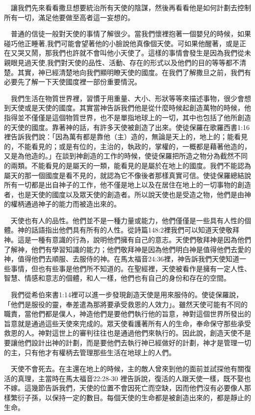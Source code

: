 \documentclass{book}
\begin{document}
　讓我們先來看看撒旦想要統治所有天使的陰謀，然後再看看他是如何計劃去控制所有一切，滿足他要做至高者這一妄想的。

　普通的信徒一般對天使的事情了解很少。當我們懷裡抱著一個嬰兒的時候，如果碰巧他正睡著,我們可能會望著他的小臉說他真像個天使。可如果他醒著，或是正在又哭又鬧，那我們也許就不會叫他小天使了。這樣的事情會發生是因為我們從未親眼見過天使,我們對天使的品性、活動、存在的形式以及他們的目的等等都不清楚。其實，神已經清楚地向我們顯明瞭天使的國度。在我們了解撒旦之前，我們有必要先了解一下天使國度裡一部份重要情況。

　我們生活在物質世界裡，習慣于用重量、大小、形狀等等來描述事物，很少會想到天使或是天使的國度。其實當神告訴我們他是從什麼時候起創造萬物的時候，他指得並不僅僅是這個物質世界，也不是單指地球上的一切，其中也包括了他所創造的天使的國度。靠著神的話，有許多天使被創造了出來。使徒保羅在歌羅西書1:16裡告訴我們說：「因為萬有都是靠他（主）造的，無論是天上的，地上的；能看見的，不能看見的；或是有位的，主治的，執政的，掌權的，一概都是藉著他造的，又是為他造的。」在談到神創造的工作的時候，使徒保羅把所造之物分為截然不同的兩類。不能看見的是屬天的一類，能看見的是屬於在地上的國度。我們不能認為屬天的那一個國度是看不見的，就認為它不像後者那樣真實可信。使徒保羅總結說所有一切都是出自神子的工作，他不僅是地上以及在居住在地上的一切事物的創造者，也是天使的國度以及眾天使的創造者。所以說天使也是受造之物，他們是由神的權柄通過神子的能力而被造出來的。

　天使也有人的品性。他們並不是一種力量或能力，他們僅僅是一些具有人性的個體。神的話語指出他們具有所有的人性。從詩篇148:2裡我們可以知道天使敬拜神。這是一種有意識的行為，說明他們擁有自己的意志。天使們敬拜神是因為他們了解神，他們有學習知識的能力；他們敬拜神是因為他們明白神是值得他們去愛的神，值得他們去順服、去服侍的神。在馬太福音24:36裡，神告訴我們天使知道一些事情，但也有些事是他們所不知道的。在聖經裡，天使被看作是擁有一定人性、智慧、情感和意志的個體，和人一樣，他們也有自己的身份和存在的空間。

　我們從希伯來書1:14裡可以進一步發現創造天使是用來服侍的。使徒保羅說，「他們是服役的靈，奉差遣為那將要承受救恩的人效力」。雖然天使可能有不同的職責，當他們都是僕人，神造他們是要他們執行他的旨意，神對這個世界所發出的旨意就是通過這些天使來完成的。眾天使看護著所有人的生命，奉命保守那些承受救恩的人。神對這世上的審判往往也是通過他們來執行的。因此說，創造天使不是要讓他們設計出神的計劃，而是要他們去執行神已經做好的計劃，神才是管理一切的主，只有他才有權柄去管理那些生活在地球上的人們。

　天使不會死去。在主還在地上的時候，主的敵人曾來到他的面前並試探他有關復活的真理，主當時在馬太福音22:28-30 裡告訴說，復活的人跟天使一樣，既不娶也不嫁。這幾節告訴我們，天使的位置不會因死亡而空缺，因而他們沒有必要像人那樣繁衍子孫，以保持一定的數目。每個天使的生命都是被創造出來的，都是靜止的生命。
\end{document}
